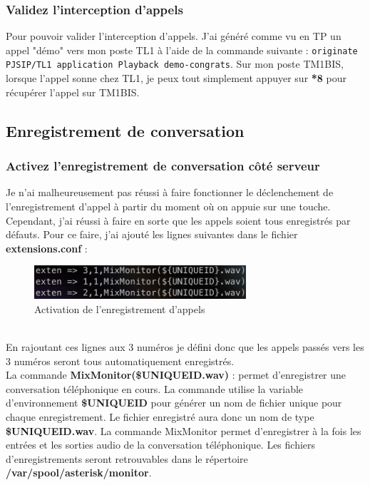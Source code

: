 \documentclass[12pt, a4paper]{article}
\begin{document}
	\newpage
	\subsubsection{Validez l'interception d'appels}
	Pour pouvoir valider l'interception d'appels. J'ai généré comme vu en TP
	un appel "démo" vers mon poste TL1 à l'aide de la commande suivante : 
	\texttt{originate PJSIP/TL1 application Playback demo-congrats}. 
	Sur mon poste TM1BIS, lorsque l'appel sonne chez TL1, je peux 
	tout simplement appuyer sur \textbf{*8} pour récupérer l'appel sur TM1BIS. 

	\subsection{Enregistrement de conversation}
	\subsubsection{Activez l'enregistrement de conversation côté serveur}
	Je n'ai malheureusement pas réussi à faire fonctionner le déclenchement
	de l'enregistrement d'appel à partir du moment où on appuie sur une touche.
	Cependant, j'ai réussi à faire en sorte que les appels soient tous enregistrés
	par défauts. Pour ce faire, j'ai ajouté les lignes suivantes dans le fichier
	\textbf{extensions.conf} :
	\begin{figure}[h]
		\centering
		\includegraphics[width=0.7\textwidth]{img/monitor.png}
		\caption{Activation de l'enregistrement d'appels}
		\label{fig:monitor}
	\end{figure}\\
	En rajoutant ces lignes aux 3 numéros je défini donc que les appels
	passés vers les 3 numéros seront tous automatiquement enregistrés.\\

	La commande \textbf{MixMonitor(\${UNIQUEID}.wav)} :  permet d'enregistrer 
	une conversation téléphonique en cours. La commande utilise la variable 
	d'environnement \textbf{\${UNIQUEID}} pour générer un nom de fichier 
	unique pour chaque enregistrement. Le fichier enregistré aura donc un 
	nom de type \textbf{\${UNIQUEID}.wav}. La commande MixMonitor permet 
	d'enregistrer à la fois les entrées et les sorties audio de la 
	conversation téléphonique. Les fichiers d'enregistrements seront retrouvables
	dans le répertoire \textbf{/var/spool/asterisk/monitor}.\\
\end{document}

